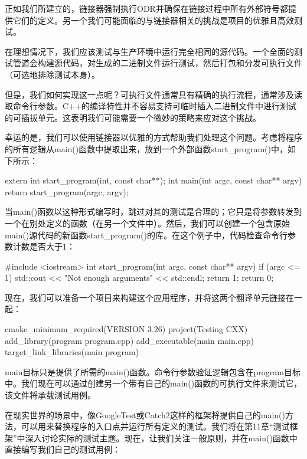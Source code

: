 正如我们所建立的，链接器强制执行ODR并确保在链接过程中所有外部符号都提供它们的定义。另一个我们可能面临的与链接器相关的挑战是项目的优雅且高效测试。

在理想情况下，我们应该测试与生产环境中运行完全相同的源代码。一个全面的测试管道会构建源代码，对生成的二进制文件运行测试，然后打包和分发可执行文件（可选地排除测试本身）。

但是，我们如何实现这一点呢？可执行文件通常具有精确的执行流程，通常涉及读取命令行参数。C++的编译特性并不容易支持可临时插入二进制文件中进行测试的可插拔单元。这表明我们可能需要一个微妙的策略来应对这个挑战。

幸运的是，我们可以使用链接器以优雅的方式帮助我们处理这个问题。考虑将程序的所有逻辑从main()函数中提取出来，放到一个外部函数start\_program()中，如下所示：


\begin{cpp}
extern int start_program(int, const char**);
int main(int argc, const char** argv) {
    return start_program(argc, argv);
}
\end{cpp}

当main()函数以这种形式编写时，跳过对其的测试是合理的；它只是将参数转发到一个在别处定义的函数（在另一个文件中）。然后，我们可以创建一个包含原始main()源代码的新函数start\_program()的库。在这个例子中，代码检查命令行参数计数是否大于1：


\begin{cpp}
#include <iostream>
int start_program(int argc, const char** argv) {
    if (argc <= 1) {
        std::cout << "Not enough arguments" << std::endl;
        return 1;
    }
    return 0;
}
\end{cpp}

现在，我们可以准备一个项目来构建这个应用程序，并将这两个翻译单元链接在一起：


\begin{cmake}
cmake_minimum_required(VERSION 3.26)
project(Testing CXX)
add_library(program program.cpp)
add_executable(main main.cpp)
target_link_libraries(main program)
\end{cmake}

main目标只是提供了所需的main()函数。命令行参数验证逻辑包含在program目标中。我们现在可以通过创建另一个带有自己的main()函数的可执行文件来测试它，该文件将承载测试用例。

在现实世界的场景中，像GoogleTest或Catch2这样的框架将提供自己的main()方法，可以用来替换程序的入口点并运行所有定义的测试。我们将在第11章“测试框架”中深入讨论实际的测试主题。现在，让我们关注一般原则，并在main()函数中直接编写我们自己的测试用例：

